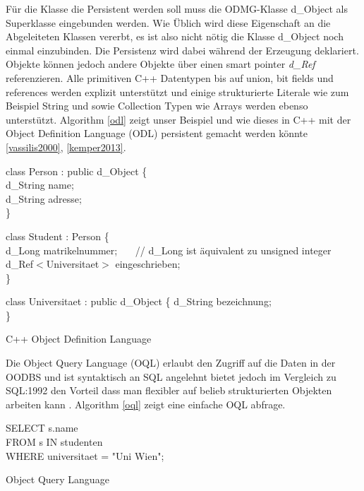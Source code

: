Für die Klasse die Persistent werden soll muss die ODMG-Klasse d\_Object als Superklasse eingebunden werden. Wie Üblich wird diese Eigenschaft an die Abgeleiteten Klassen vererbt, es ist also nicht nötig die Klasse d\_Object noch einmal einzubinden. Die Persistenz wird dabei während der Erzeugung deklariert. Objekte können jedoch andere Objekte über einen smart pointer \emph{d\_Ref} referenzieren. Alle primitiven C++ Datentypen bis auf union, bit fields und references werden explizit unterstützt und einige strukturierte Literale wie zum Beispiel String und sowie Collection Typen wie Arrays werden ebenso unterstützt. Algorithm \ref{odl} zeigt unser Beispiel und wie dieses in C++ mit der Object Definition Language (ODL) persistent gemacht werden könnte \ref{vassilis2000}, \ref{kemper2013}.

\vspace{.3cm}
\begin{algorithm}[H]
	class Person : public d\_Object \{ \\
		\Indp
		d\_String name; \\
		d\_String adresse; \\
		\Indm
	\}

	class Student : Person \{ \\
		\Indp
		d\_Long matrikelnummer;  ~~~// d\_Long ist äquivalent zu unsigned integer \\
		d\_Ref\(<\)Universitaet\(>\) eingeschrieben; \\
		\Indm
	\}

	class Universitaet : public d\_Object \{
		\Indp
		d\_String bezeichnung; \\
		\Indm
	\}
	\caption{C++ Object Definition Language}
	\label{odl}
\end{algorithm}
\vspace{.3cm}

Die Object Query Language (OQL) erlaubt den Zugriff auf die Daten in der OODBS und ist syntaktisch an SQL angelehnt bietet jedoch im Vergleich zu SQL:1992 den Vorteil dass man flexibler auf belieb strukturierten Objekten arbeiten kann \cite{kemper2013}. Algorithm \ref{oql} zeigt eine einfache OQL abfrage.

\vspace{.3cm}
\begin{algorithm}[H]
	SELECT s.name \\
	FROM s IN studenten \\
	WHERE universitaet = "{}Uni Wien"{};
	\caption{Object Query Language}
	\label{oql}	
\end{algorithm}
\vspace{.3cm}

